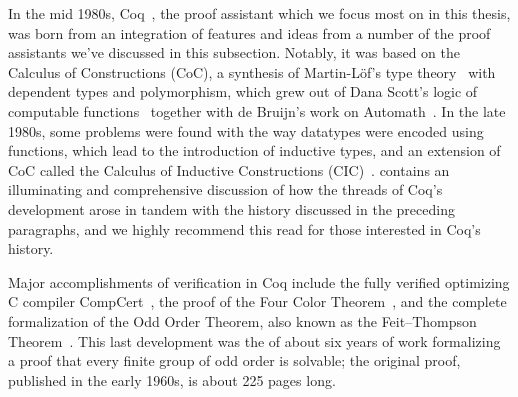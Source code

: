 \begin{comment}
After a three-year effort, Trusted Logic succeeded in the formal modeling of the whole execution environment for the JavaCard language.
This work on security was awarded the EAL7 certification level (the highest level in the so-called common criteria).
This formal development required 121000 lines of \emph{Coq} development in 278 modules.

\emph{Coq} is also used to develop libraries of advanced mathematical theorems in both constructive and classical form.
The domain of classical mathematics required restrictions to the logical language of \emph{Coq} in order to remain consistent with some of the axioms that are naturally used by mathematicians.
\end{quote}
\begin{flushright}
  --- Gérard Huet and Christine Paulin-Mohring, November 2003~\cite{CoqArtForward2013Huet}
\end{flushright}
\end{comment}

In the mid 1980s, Coq~\cite{Coq}, the proof assistant which we focus most on in this thesis, was born from an integration of features and ideas from a number of the proof assistants we've discussed in this subsection.
Notably, it was based on the Calculus of Constructions (CoC), a synthesis of Martin-Löf's type theory~\cite{Intuitionistic1975MartinLoef,Constructive1982MartinLoef} with dependent types and polymorphism, which grew out of Dana Scott's logic of computable functions~\cite{Type1993Scott} together with de Bruijn's work on Automath~\cite{CoqArtForward2013Huet}.
In the late 1980s, some problems were found with the way datatypes were encoded using functions, which lead to the introduction of inductive types, and an extension of CoC called the Calculus of Inductive Constructions (CIC)~\cite{CoqArtForward2013Huet}.
\textcite{CoqArtForward2013Huet} contains an illuminating and comprehensive discussion of how the threads of Coq's development arose in tandem with the history discussed in the preceding paragraphs, and we highly recommend this read for those interested in Coq's history.

Major accomplishments of verification in Coq include the fully verified optimizing C compiler CompCert~\cite{Compcert}, the proof of the Four Color Theorem~\cite{gonthier2008formal}, and the complete formalization of the Odd Order Theorem, also known as the Feit--Thompson Theorem~\cite{gonthier2013machine}.
This last development was the of about six years of work formalizing a proof that every finite group of odd order is solvable; the original proof, published in the early 1960s, is about 225 pages long.

